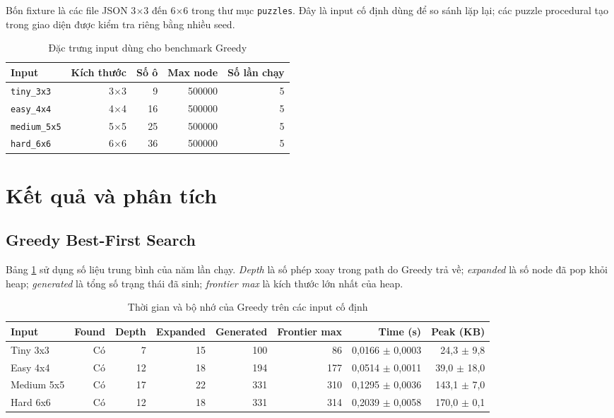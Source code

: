 \documentclass[12pt,a4paper]{article}
\newcommand{\code}[1]{\texttt{#1}}
\begin{document}
Bốn fixture là các file JSON 3\(\times\)3 đến 6\(\times\)6 trong thư mục \code{puzzles}. Đây là input cố định dùng để so sánh lặp lại; các puzzle procedural tạo trong giao diện được kiểm tra riêng bằng nhiều seed.

\begin{table}[H]
\centering
\caption{Đặc trưng input dùng cho benchmark Greedy}
\begin{tabular}{lrrrr}
\toprule
Input & Kích thước & Số ô & Max node & Số lần chạy\\
\midrule
\code{tiny\_3x3} & 3\(\times\)3 & 9 & 500000 & 5\\
\code{easy\_4x4} & 4\(\times\)4 & 16 & 500000 & 5\\
\code{medium\_5x5} & 5\(\times\)5 & 25 & 500000 & 5\\
\code{hard\_6x6} & 6\(\times\)6 & 36 & 500000 & 5\\
\bottomrule
\end{tabular}
\end{table}

\section{Kết quả và phân tích}
\subsection{Greedy Best-First Search}
Bảng \ref{tab:greedy} sử dụng số liệu trung bình của năm lần chạy. \emph{Depth} là số phép xoay trong path do Greedy trả về; \emph{expanded} là số node đã pop khỏi heap; \emph{generated} là tổng số trạng thái đã sinh; \emph{frontier max} là kích thước lớn nhất của heap.

\begin{table}[H]
\centering
\caption{Thời gian và bộ nhớ của Greedy trên các input cố định}
\label{tab:greedy}
\small
\begin{tabular}{lrrrrrrr}
\toprule
Input & Found & Depth & Expanded & Generated & Frontier max & Time (s) & Peak (KB)\\
\midrule
Tiny 3x3 & Có & 7 & 15 & 100 & 86 & 0,0166 $\pm$ 0,0003 & 24,3 $\pm$ 9,8\\
Easy 4x4 & Có & 12 & 18 & 194 & 177 & 0,0514 $\pm$ 0,0011 & 39,0 $\pm$ 18,0\\
Medium 5x5 & Có & 17 & 22 & 331 & 310 & 0,1295 $\pm$ 0,0036 & 143,1 $\pm$ 7,0\\
Hard 6x6 & Có & 12 & 18 & 331 & 314 & 0,2039 $\pm$ 0,0058 & 170,0 $\pm$ 0,1\\
\bottomrule
\end{tabular}
\end{table}
\end{document}
